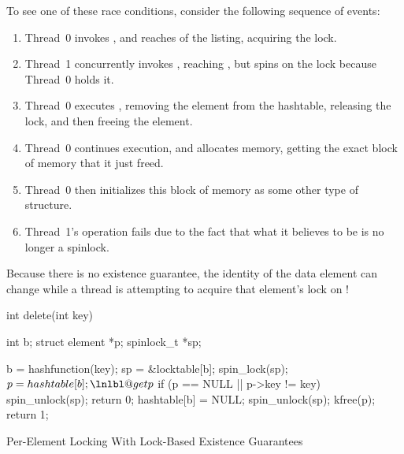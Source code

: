 \begin{fcvref}
To see one of these race conditions, consider the following sequence
of events:
\begin{enumerate}
\item	Thread~0 invokes , and reaches  of
	the listing, acquiring the lock.
\item	Thread~1 concurrently invokes , reaching
	, but spins on the lock because Thread~0 holds it.
\item	Thread~0 executes , removing the element from
	the hashtable, releasing the lock, and then freeing the
	element.
\item	Thread~0 continues execution, and allocates memory, getting
	the exact block of memory that it just freed.
\item	Thread~0 then initializes this block of memory as some
	other type of structure.
\item	Thread~1's  operation fails due to the
	fact that what it believes to be  is no longer
	a spinlock.
\end{enumerate}
Because there is no existence guarantee, the identity of the
data element can change while a thread is attempting to acquire
that element's lock on !
\end{fcvref}

\begin{listing}
\begin{fcvlabel}
\begin{VerbatimL}[commandchars=\\\@\$]
int delete(int key)
{
	int b;
	struct element *p;
	spinlock_t *sp;

	b = hashfunction(key);
	sp = &locktable[b];
	spin_lock(sp);				\lnlbl@acq$
	p = hashtable[b];			\lnlbl@getp$
	if (p == NULL || p->key != key) {
		spin_unlock(sp);
		return 0;
	}
	hashtable[b] = NULL;
	spin_unlock(sp);
	kfree(p);
	return 1;
}
\end{VerbatimL}
\end{fcvlabel}
\caption{Per-Element Locking With Lock-Based Existence Guarantees}
\label{lst:locking:Per-Element Locking With Lock-Based Existence Guarantees}
\end{listing}

